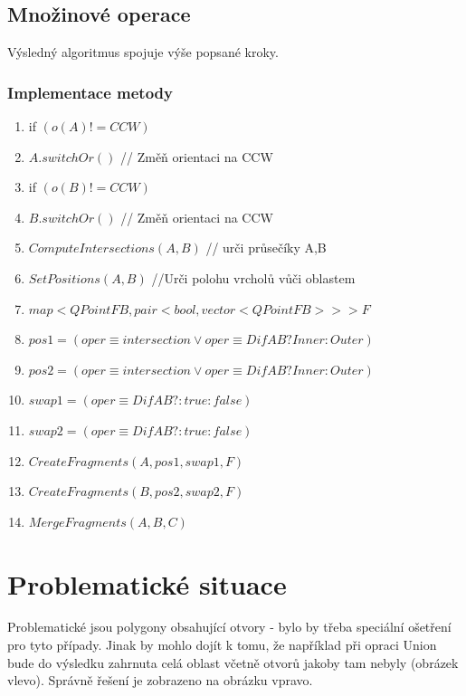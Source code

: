 \documentclass[a4paper, 12pt]{article}
\begin{document}
\clearpage

\subsection{Množinové operace}

Výsledný algoritmus spojuje výše popsané kroky. \\

\subsubsection{Implementace metody}
\begin{enumerate}
	\item if $ (o(A) != CCW) $
	\item \hspace{1cm} $ A.switchOr() $ // Změň orientaci na CCW
	\item if $ (o(B) != CCW) $
	\item \hspace{1cm} $ B.switchOr() $ // Změň orientaci na CCW
	\item $ ComputeIntersections(A,B) $ // urči průsečíky A,B
	\item $ SetPositions (A,B) $ //Urči polohu vrcholů vůči oblastem
	\item $map <QPointFB, pair <bool, vector<QPointFB>>> F$
	\item $ pos1 = (oper \equiv intersection \vee oper \equiv DifAB?Inner:Outer) $
	\item $ pos2 = (oper \equiv intersection \vee oper \equiv DifAB?Inner:Outer) $
	\item $ swap1 = (oper \equiv DifAB? : true : false) $
	\item $ swap2 = (oper \equiv DifAB? : true : false) $
	\item $ CreateFragments (A, pos1, swap1, F) $
	\item $ CreateFragments (B, pos2, swap2, F) $
	\item $ MergeFragments (A,B,C) $
\end{enumerate}

\clearpage

\section{Problematické situace}

Problematické jsou polygony obsahující otvory - bylo by třeba speciální ošetření pro tyto případy. Jinak by mohlo dojít k tomu, že například při opraci Union bude do výsledku zahrnuta celá oblast včetně otvorů jakoby tam nebyly (obrázek vlevo). Správně řešení je zobrazeno na obrázku vpravo.\\
\end{document}
